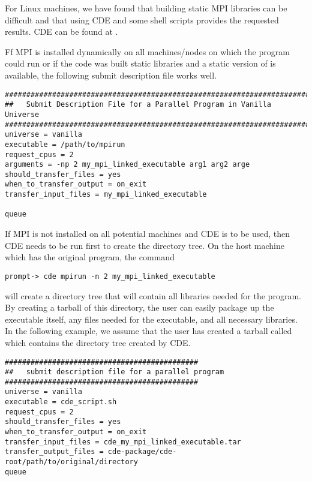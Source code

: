 For Linux machines, we have found that building static MPI libraries can be 
difficult and that 
using CDE and some shell scripts provides the requested results. CDE can be
found at .

Ff MPI is installed dynamically on all machines/nodes on which the program 
could run or if the code was built static libraries and a static version of 
 is available, the following
submit description file works well.
\begin{verbatim}
################################################################################
##   Submit Description File for a Parallel Program in Vanilla Universe
################################################################################
universe = vanilla
executable = /path/to/mpirun
request_cpus = 2
arguments = -np 2 my_mpi_linked_executable arg1 arg2 arge
should_transfer_files = yes
when_to_transfer_output = on_exit
transfer_input_files = my_mpi_linked_executable

queue
\end{verbatim}

If MPI is not installed on all potential machines and CDE is to be used,
then CDE needs to be run first to create the directory tree. On the host machine
which has the original program, the command

\begin{verbatim}
prompt-> cde mpirun -n 2 my_mpi_linked_executable
\end{verbatim}

will create a directory tree that will contain all libraries needed for the 
program. By creating a tarball of this directory, the user can easily package up
the executable itself, any files needed for the executable, and all necessary
libraries. In the following example, we assume that the user has created a 
tarball called  which contains the 
directory tree created by CDE.

\begin{verbatim}
#############################################
##   submit description file for a parallel program
#############################################
universe = vanilla
executable = cde_script.sh
request_cpus = 2
should_transfer_files = yes
when_to_transfer_output = on_exit
transfer_input_files = cde_my_mpi_linked_executable.tar
transfer_output_files = cde-package/cde-root/path/to/original/directory
queue
\end{verbatim}

